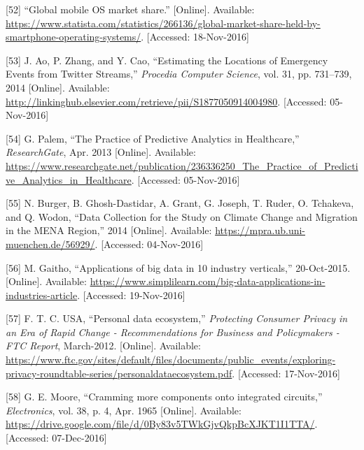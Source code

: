 \documentclass[12pt,english,a4paper,titlepage,cleardoublepage=empty,dottedtoc]{report}
\begin{document}
\hypertarget{ref-graphic_2016_global-mobile-os-market-share}{}
{[}52{]} ``Global mobile OS market share.'' {[}Online{]}. Available:
\url{https://www.statista.com/statistics/266136/global-market-share-held-by-smartphone-operating-systems/}.
{[}Accessed: 18-Nov-2016{]}

\hypertarget{ref-estimating-the-locations-of-emergency-events-from-twitter-streams_2014}{}
{[}53{]} J. Ao, P. Zhang, and Y. Cao, ``Estimating the Locations of
Emergency Events from Twitter Streams,'' \emph{Procedia Computer
Science}, vol. 31, pp. 731--739, 2014 {[}Online{]}. Available:
\url{http://linkinghub.elsevier.com/retrieve/pii/S1877050914004980}.
{[}Accessed: 05-Nov-2016{]}

\hypertarget{ref-the-practice-of-predictive-analytics-in-healthcare_2013}{}
{[}54{]} G. Palem, ``The Practice of Predictive Analytics in
Healthcare,'' \emph{ResearchGate}, Apr. 2013 {[}Online{]}. Available:
\url{https://www.researchgate.net/publication/236336250_The_Practice_of_Predictive_Analytics_in_Healthcare}.
{[}Accessed: 05-Nov-2016{]}

\hypertarget{ref-data-collection-for-climate-changes_2014}{}
{[}55{]} N. Burger, B. Ghosh-Dastidar, A. Grant, G. Joseph, T. Ruder, O.
Tchakeva, and Q. Wodon, ``Data Collection for the Study on Climate
Change and Migration in the MENA Region,'' 2014 {[}Online{]}. Available:
\url{https://mpra.ub.uni-muenchen.de/56929/}. {[}Accessed:
04-Nov-2016{]}

\hypertarget{ref-graphic_2015_applications-of-big-data-in-10-industry-verticals}{}
{[}56{]} M. Gaitho, ``Applications of big data in 10 industry
verticals,'' 20-Oct-2015. {[}Online{]}. Available:
\url{https://www.simplilearn.com/big-data-applications-in-industries-article}.
{[}Accessed: 19-Nov-2016{]}

\hypertarget{ref-graphic_2012_personal-data-ecosystem}{}
{[}57{]} F. T. C. USA, ``Personal data ecosystem,'' \emph{Protecting
Consumer Privacy in an Era of Rapid Change - Recommendations for
Business and Policymakers - FTC Report}, March-2012. {[}Online{]}.
Available:
\url{https://www.ftc.gov/sites/default/files/documents/public_events/exploring-privacy-roundtable-series/personaldataecosystem.pdf}.
{[}Accessed: 17-Nov-2016{]}

\hypertarget{ref-paper_1965_moors-law}{}
{[}58{]} G. E. Moore, ``Cramming more components onto integrated
circuits,'' \emph{Electronics}, vol. 38, p. 4, Apr. 1965 {[}Online{]}.
Available:
\url{https://drive.google.com/file/d/0By83v5TWkGjvQkpBcXJKT1I1TTA/}.
{[}Accessed: 07-Dec-2016{]}
\end{document}
